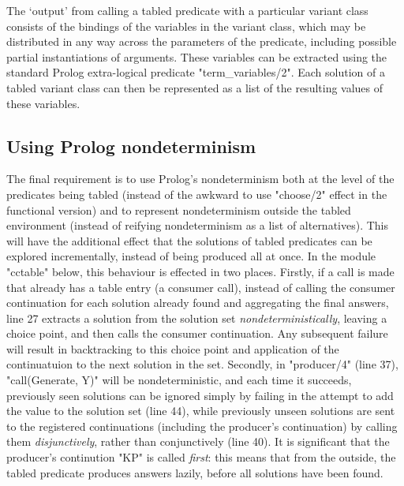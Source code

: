 The `output' from calling a tabled predicate with a particular variant class consists of
the bindings of the variables in the variant class, which may be distributed in any
way across the parameters of the predicate, including possible partial instantiations
of arguments. These variables can be extracted using the standard Prolog extra-logical
predicate "term_variables/2". Each solution of a tabled variant class can then be represented
as a list of the resulting values of these variables.

\subsection{Using Prolog nondeterminism}

The final requirement is to use Prolog's nondeterminism both at the level of the predicates
being tabled (instead of the awkward to use "choose/2" effect in the functional version)
and to represent nondeterminism outside the tabled environment (instead of reifying nondeterminism
as a list of alternatives). This will have the additional effect that the solutions of tabled
predicates can be explored incrementally, instead of being produced all at once.
In the module "cctable" below, this behaviour is effected in two places. Firstly, if a call is made
that already has a table entry (\ie a consumer call), instead of calling the consumer continuation
for each solution already found and aggregating the final answers, line 27 extracts a solution
from the solution set \emph{nondeterministically}, leaving a choice point, and then calls
the consumer continuation. Any subsequent failure will result in backtracking to this choice
point and application of the continuatuion to the next solution in the set.
Secondly, in "producer/4" (line 37), "call(Generate, Y)" will be nondeterministic, and each time it succeeds,
previously seen solutions can be ignored simply by failing in the attempt to add the value to the 
solution set (line 44),
while previously unseen solutions are sent to the registered continuations (including the producer's
continuation) by calling them \emph{disjunctively}, rather than conjunctively (line 40). It is significant that
the producer's continution "KP" is called \emph{first}: this means that from the outside,
the tabled predicate produces answers lazily, before all solutions have been found.

